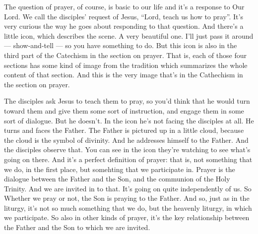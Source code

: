 The question of prayer, of course, is basic to our life and it's a response to Our Lord. We call the disciples' request of Jesus, ``Lord, teach us how to pray''.  It's very curious the way he goes about responding to that question. And there's a little icon, which describes the scene. A very beautiful one. I'll just pass it around --- show-and-tell --- so you have something to do. But this icon is also in the third part of the Catechism in the section on prayer. That is, each of those four sections has some kind of image from the tradition which summarizes the whole content of that section. And this is the very image that's in the Cathechism in the section on prayer.

The disciples ask Jesus to teach them to pray, so you'd think that he would turn toward them and give them some sort of instruction, and engage them in some sort of dialogue. But he doesn't. In the icon he's not facing the disciples at all. He turns and faces the Father. The Father is pictured up in a little cloud, because the cloud is the symbol of divinity. And he addresses himself to the Father. And the disciples observe that. You can see in the icon they're watching to see what's going on there. And it's a perfect definition of prayer: that is, not something that we do, in the first place, but somehting that we participate in. Prayer is the dialogue between the Father and the Son, and the communion of the Holy Trinity. And we are invited in to that. It's going on quite independently of us. So Whether we pray or not, the Son is praying to the Father. And so, just as in the liturgy, it's not so much something that we do, but the heavenly liturgy, in which we participate. So also in other kinds of prayer, it's the key relationship between the Father and the Son to which we are invited.

